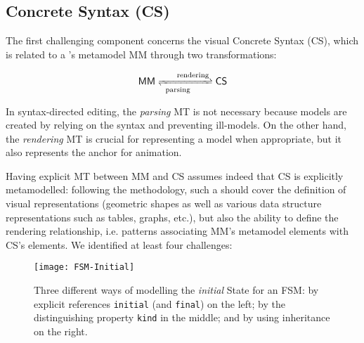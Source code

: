 \subsection{Concrete Syntax (CS)}
\label{sec:CS}

The first challenging component concerns the visual Concrete Syntax (CS), which
is related to a \DSML's metamodel \textsf{MM} through two transformations:

$$ \mathsf{MM} \xrightleftharpoons[\mathrm{parsing}\phantom{MM}]{\phantom{MM}\mathrm{rendering}} \mathsf{CS}$$

In syntax-directed editing, the \emph{parsing} MT is not necessary because models
are created by relying on the syntax and preventing ill-models. On the other hand,
the \emph{rendering} MT is crucial for representing a model when appropriate, but
it also represents the anchor for animation. 

Having explicit MT between \textsf{MM} and \textsf{CS} assumes indeed that 
\textsf{CS} is explicitly metamodelled: following the \MDE methodology, such
a \DSL should cover the definition of visual representations (geometric shapes as
well as various data structure representations such as tables, graphs, etc.),
but also the ability to define the rendering relationship, i.e. patterns associating
\textsf{MM}'s metamodel elements with \textsf{CS}'s elements.
We identified at least four challenges:

\begin{figure}[t]%
   \centering
   \texttt{[image: FSM-Initial]}%
   \caption{Three different ways of modelling the \emph{initial} \textsf{State} 
   for an \textsf{FSM}: by explicit references \texttt{initial} (and \texttt{final})
   on the left; by the distinguishing property \texttt{kind} in the middle; and
   by using inheritance on the right.}%
   \label{fig:FSM-Initial}%
\end{figure}

